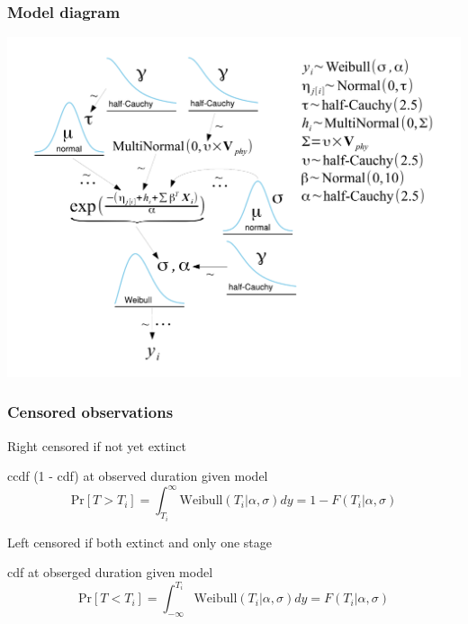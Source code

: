 \documentclass{beamer}
\begin{document}
\begin{frame}
  \frametitle{Model diagram}
  \begin{center}
    \includegraphics[height = 0.8\textheight, width = \textwidth,  keepaspectratio = true]{figure/mammal_survival_model}
  \end{center}
\end{frame}

\begin{frame}
  \frametitle{Censored observations}

  
  Right censored if not yet extinct

  ccdf (1 - cdf) at observed duration given model
  \begin{equation}
    \mathrm{Pr}[T > T_{i}] = \int_{T_{i}}^{\infty} \mathrm{Weibull}(T_{i} | \alpha, \sigma) dy = 1 - F(T_{i} | \alpha, \sigma)
    \label{eq:right_cen}
  \end{equation}
  

  Left censored if both extinct and only one stage

  cdf at obserged duration given model
  \begin{equation}
    \mathrm{Pr}[T < T_{i}] = \int_{-\infty}^{T_{i}} \mathrm{Weibull}(T_{i} | \alpha, \sigma) dy = F(T_{i} | \alpha, \sigma)
    \label{eq:left_cen}
  \end{equation}

\end{frame}
\end{document}
